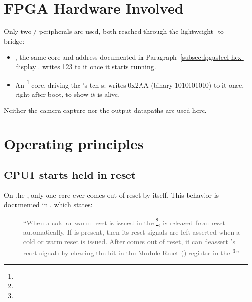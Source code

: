 \section{FPGA Hardware Involved}
\label{sec:fpgasteel-dualcore-hardware}

Only two / peripherals are used, both reached through the lightweight -to- bridge:

\begin{itemize}
    \item {}, the same core and address documented in Paragraph~\ref{subsec:fpgasteel-hex-display}.  writes 123 to it once it starts running.
    \item An  \footnote{} core, driving the 's ten s:  writes 0x2AA (binary 1010101010) to it once, right after boot, to show it is alive.
\end{itemize}

Neither the camera capture nor the  output datapaths are used here.

\section{Operating principles}
\label{sec:fpgasteel-dualcore-operating-principles}

\subsection{CPU1 starts held in reset}
\label{subsec:fpgasteel-dualcore-cpu1-reset}

On the , only one core ever comes out of reset by itself. This behavior is documented in \cite[Chapter 10, `` Microprocessor Unit Subsystem'', p.~10-6]{CV-TRM}, which states:

\begin{quote}
    ``When a cold or warm reset is issued in the \footnote{},  is released from reset automatically. If  is present, then its reset signals are left asserted when a cold or warm reset is issued. After  comes out of reset, it can deassert 's reset signals by clearing the  bit in the  Module Reset () register in the \footnote{}.''
\end{quote}

